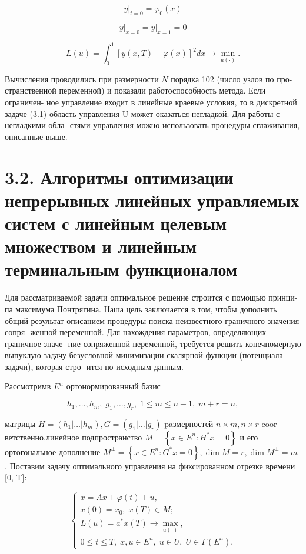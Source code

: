 \documentclass[10pt]{article}
\begin{document}
\[
{\left. y\right| }_{t = 0} = {\varphi }_{0}\left( x\right)
\]

\[
{\left. y\right| }_{x = 0} = {\left. y\right| }_{x = 1} = 0
\]

\[
L\left( u\right)  = {\int }_{0}^{1}{\left[  y\left( x,T\right)  - \varphi \left( x\right) \right]  }^{2}{dx} \rightarrow  \mathop{\min }\limits_{{u\left( \cdot \right) }}.
\]

Вычисления проводились при размерности \(N\) порядка 102 (число узлов по про- странственной переменной) и показали работоспособность метода. Если ограничен- ное управление входит в линейные краевые условия, то в дискретной задаче (3.1) область управления U может оказаться негладкой. Для работы с негладкими обла- стями управления можно использовать процедуры сглаживания, описанные выше.

\section*{3.2. Алгоритмы оптимизации непрерывных линейных управляемых систем с линейным целевым множеством и линейным терминальным функционалом}

Для рассматриваемой задачи оптимальное решение строится с помощью принци- па максимума Понтрягина. Наша цель заключается в том, чтобы дополнить общий результат описанием процедуры поиска неизвестного граничного значения сопря- женной переменной. Для нахождения параметров, определяющих граничное значе- ние сопряженной переменной, требуется решить конечномерную выпуклую задачу безусловной минимизации скалярной функции (потенциала задачи), которая стро- ится по исходным данным.

Рассмотримв \({E}^{n}\) ортонормированный базис

\[
{h}_{1},\ldots ,{h}_{m},\;{g}_{1},\ldots ,{g}_{r},\;1 \leq  m \leq  n - 1,\;m + r = n,
\]

матрицы \(H = \left( {{h}_{1}\left| \ldots \right| {h}_{m}}\right) ,G = \left( {{g}_{1}\left| \ldots \right| {g}_{r}}\right)\) paзмерностей \(n \times  m,n \times  r\) coor- ветственно,линейное подпространство \(M = \left\{  {x \in  {E}^{n} : {H}^{ * }x = 0}\right\}\) и его ортогональное дополнение \({M}^{ \bot  } = \left\{  {x \in  {E}^{n} : {G}^{ * }x = 0}\right\}  ,\dim M = r,\dim {M}^{ \bot  } = m\) . Поставим задачу оптимального управления на фиксированном отрезке времени [0, T]:

\[
\left\{  \begin{array}{l} \dot{x} = {Ax} + \varphi \left( t\right)  + u, \\  x\left( 0\right)  = {x}_{0},\;x\left( T\right)  \in  M; \\  L\left( u\right)  = {a}^{ * }x\left( T\right)  \rightarrow  \mathop{\max }\limits_{{u\left( \cdot \right) }}, \\  0 \leq  t \leq  T,\;x,u \in  {E}^{n},\;u \in  U,\;U \in  \Gamma \left( {E}^{n}\right) . \end{array}\right. \tag{3.8}
\]
\end{document}
